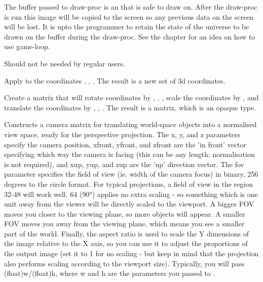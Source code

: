 The buffer passed to draw-proc is an  that is safe to draw on. After the draw-proc is run this image will be copied to the screen so any previous data on the screen will be lost. It is upto the programmer to retain the state of the universe to be drawn on the buffer during the draw-proc. See the  chapter for an idea on how to use game-loop.


Should not be needed by regular users.


Apply  to the coordinates , , . The result is a new set of 3d coordinates.


Create a matrix that will rotate coordinates by , , , scale the coordinates by , and translate the coordinates by , , . The result is a matrix, which is an opaque type.


Constructs a camera matrix for translating world-space objects into a normalised view space, ready for the perspective projection. The x, y, and z parameters specify the camera position, xfront, yfront, and zfront are the 'in front' vector specifying which way the camera is facing (this can be any length: normalisation is not required), and xup, yup, and zup are the 'up' direction vector.  The fov parameter specifies the field of view (ie. width of the camera focus) in binary, 256 degrees to the circle format. For typical projections, a field of view in the region 32-48 will work well. 64 (90°) applies no extra scaling - so something which is one unit away from the viewer will be directly scaled to the viewport. A bigger FOV moves you closer to the viewing plane, so more objects will appear. A smaller FOV moves you away from the viewing plane, which means you see a smaller part of the world.  Finally, the aspect ratio is used to scale the Y dimensions of the image relative to the X axis, so you can use it to adjust the proportions of the output image (set it to 1 for no scaling - but keep in mind that the projection also performs scaling according to the viewport size).  Typically, you will pass (float)w/(float)h, where w and h are the parameters you passed to .

